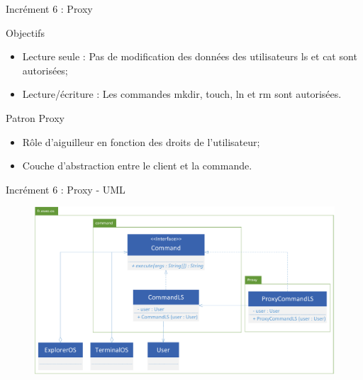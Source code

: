 \documentclass[utf8, 14pt]{beamer}
\begin{document}
	\begin{frame}{Incrément 6 : Proxy}
		\begin{block}{Objectifs}
		\begin{itemize}
		\item Lecture seule : Pas de modification des données des utilisateurs ls et cat sont autorisées;
		\item Lecture/écriture : Les commandes mkdir, touch, ln et rm sont autorisées.
		\end{itemize}
		\end{block}
		
		\begin{exampleblock}{Patron Proxy}
		\begin{itemize}
		\item Rôle d'aiguilleur en fonction des droits de l'utilisateur;
		\item Couche d'abstraction entre le client et la commande.
		\end{itemize}
		\end{exampleblock}					
	\end{frame}

	\begin{frame}{Incrément 6 : Proxy - UML}
		\begin{figure}[!h]
		\centering
		\includegraphics[width=\textwidth]{../uml/uml-proxy}
		\end{figure}		
	\end{frame}
\end{document}
